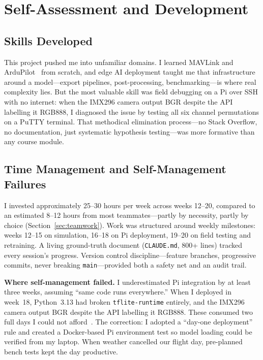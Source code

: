 \section{Self-Assessment and Development}
\label{sec:self_development}

\subsection{Skills Developed}

This project pushed me into unfamiliar domains. I learned MAVLink and ArduPilot~\cite{ardupilot,mavlink} from scratch, and edge AI deployment taught me that infrastructure around a model---export pipelines, post-processing, benchmarking---is where real complexity lies. But the most valuable skill was field debugging on a Pi over SSH with no internet: when the IMX296 camera output BGR despite the API labelling it RGB888, I diagnosed the issue by testing all six channel permutations on a PuTTY terminal. That methodical elimination process---no Stack Overflow, no documentation, just systematic hypothesis testing---was more formative than any course module.

\subsection{Time Management and Self-Management Failures}

I invested approximately 25--30 hours per week across weeks 12--20, compared to an estimated 8--12 hours from most teammates---partly by necessity, partly by choice (Section~\ref{sec:teamwork}). Work was structured around weekly milestones: weeks 12--15 on simulation, 16--18 on Pi deployment, 19--20 on field testing and retraining. A living ground-truth document (\texttt{CLAUDE.md}, 800+ lines) tracked every session's progress. Version control discipline---feature branches, progressive commits, never breaking \texttt{main}---provided both a safety net and an audit trail.

\textbf{Where self-management failed.} I underestimated Pi integration by at least three weeks, assuming ``same code runs everywhere.'' When I deployed in week~18, Python~3.13 had broken \texttt{tflite-runtime} entirely, and the IMX296 camera output BGR despite the API labelling it RGB888. These consumed two full days I could not afford~\cite{koopman2019safe}. The correction: I adopted a ``day-one deployment'' rule and created a Docker-based Pi environment test so model loading could be verified from my laptop. When weather cancelled our flight day, pre-planned bench tests kept the day productive.

